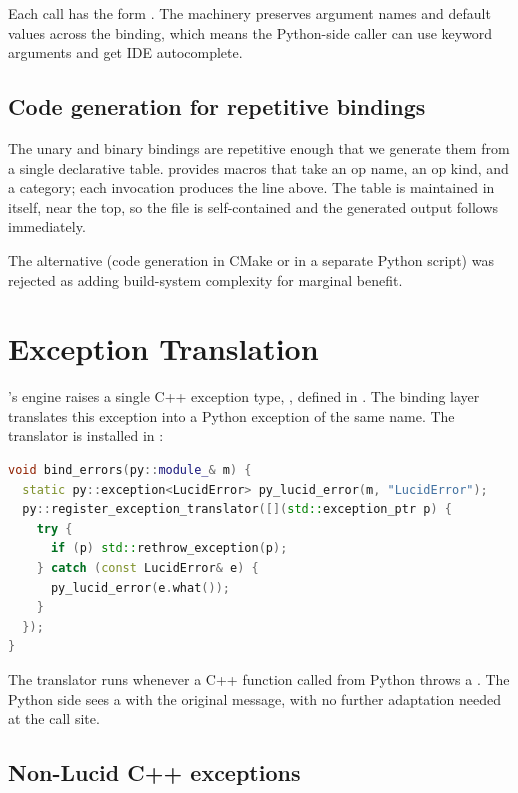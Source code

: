 Each call has the form . The  machinery preserves
argument names and default values across the binding, which means
the Python-side caller can use keyword arguments and get IDE
autocomplete.

\subsection{Code generation for repetitive bindings}
\label{ssec:python_cpp_binding:codegen}

The unary and binary bindings are repetitive enough that we
generate them from a single declarative table. 
provides macros that take an op name, an op kind, and a category;
each invocation produces the  line above. The
table is maintained in  itself, near the
top, so the file is self-contained and the generated output
follows immediately.

The alternative (code generation in CMake or in a separate Python
script) was rejected as adding build-system complexity for marginal
benefit.

\section{Exception Translation}
\label{sec:python_cpp_binding:exception_translation}

\Lucid's engine raises a single C++ exception type,
, defined in . The binding
layer translates this exception into a Python exception of the same
name. The translator is installed in :

\begin{lstlisting}[style=lucidcpp,language=C++]
void bind_errors(py::module_& m) {
  static py::exception<LucidError> py_lucid_error(m, "LucidError");
  py::register_exception_translator([](std::exception_ptr p) {
    try {
      if (p) std::rethrow_exception(p);
    } catch (const LucidError& e) {
      py_lucid_error(e.what());
    }
  });
}
\end{lstlisting}

The translator runs whenever a C++ function called from Python
throws a . The Python side sees a
 with the original message, with no further
adaptation needed at the call site.

\subsection{Non-Lucid C++ exceptions}
\label{ssec:python_cpp_binding:other_exceptions}

